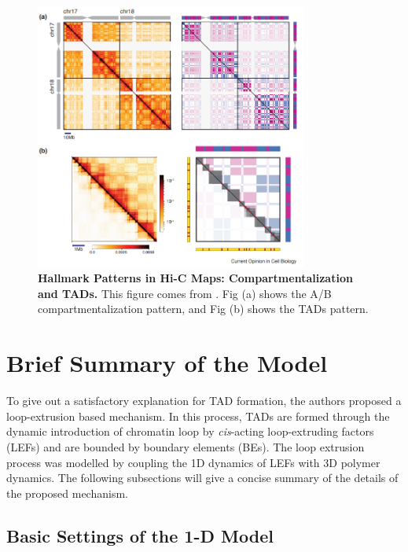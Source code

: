 \documentclass[11pt]{article}
\begin{document}
\begin{figure}[htbp]
  \centering
  \includegraphics[width=0.8\textwidth]{assets/Snipaste_2023-01-13_15-53-18.png}
  \caption{\textbf{Hallmark Patterns in Hi-C Maps: Compartmentalization and TADs.} This figure comes from \cite{mirny_two_2019}. Fig (a) shows the A/B compartmentalization pattern, and Fig (b) shows the TADs pattern.}
  \label{fig:TAD}
\end{figure}

\section{Brief Summary of the Model}

To give out a satisfactory explanation for TAD formation, the authors proposed a loop-extrusion based mechanism. In this process, TADs are formed through the dynamic introduction of chromatin loop by \textit{cis}-acting loop-extruding factors (LEFs) and are bounded by boundary elements (BEs). The loop extrusion process was modelled by coupling the 1D dynamics of LEFs with 3D polymer dynamics. The following subsections will give a concise summary of the details of the proposed mechanism.

\subsection{Basic Settings of the 1-D Model}
\end{document}
